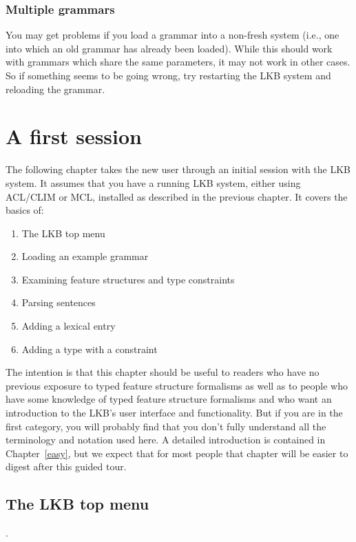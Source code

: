 \documentclass[12pt]{report}
\begin{document}
\subsection{Multiple grammars}

You may get problems if you load a grammar into a non-fresh system
(i.e., one into which an old grammar has already been loaded).
While this should work with grammars which share the same parameters,
it may not work in other cases.  So if something seems to be
going wrong, try restarting the LKB system and reloading the grammar.

\chapter{A first session}
\label{firstsession}
The following chapter takes the new user through an initial session
with the LKB system.  It assumes that you have a running LKB system,
either using ACL/CLIM or MCL,
installed as described in the previous chapter.
It covers the basics of:
\begin{enumerate}
\item The LKB top menu
\item Loading an example grammar
\item Examining feature structures and type constraints
\item Parsing sentences
\item Adding a lexical entry
\item Adding a type with a constraint
\end{enumerate}
The intention is that this chapter should be useful
to readers who have no previous exposure to
typed feature structure formalisms as well as
to people who have some knowledge of typed feature structure
formalisms and who want an introduction to the LKB's user
interface and functionality.  But if you are in the first
category, you will probably find that you don't fully understand all the
terminology and notation used here.  A detailed introduction
is contained in Chapter~\ref{easy}, but we expect that for most people
that chapter will be easier to digest after this guided tour.

\section{The LKB top menu}
\label{topmenu}.
\end{document}
